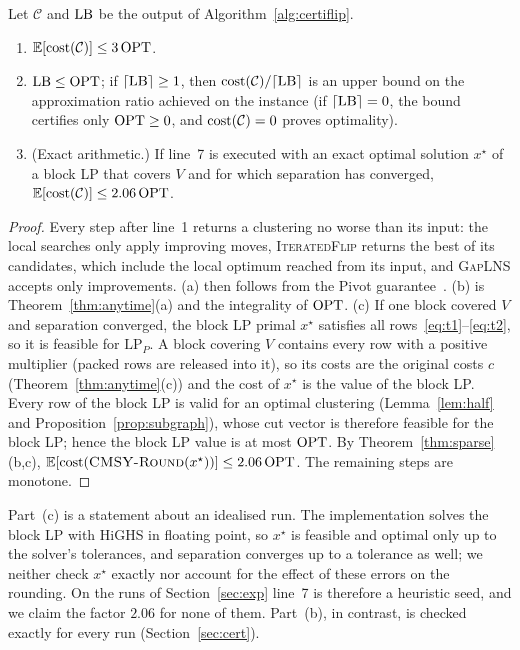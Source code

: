 \begin{theorem}\label{thm:certiflip}
Let $\mathcal C$ and $\mathrm{LB}$ be the output of Algorithm~\ref{alg:certiflip}.
\begin{enumerate}
\item[(a)] $\mathbb E[\mathrm{cost}(\mathcal C)]\le3\,\mathrm{OPT}$.
\item[(b)] $\mathrm{LB}\le\mathrm{OPT}$; if $\lceil\mathrm{LB}\rceil\ge1$, then
$\mathrm{cost}(\mathcal C)/\lceil\mathrm{LB}\rceil$ is an upper bound on the approximation
ratio achieved on the instance (if $\lceil\mathrm{LB}\rceil=0$, the bound certifies
only $\mathrm{OPT}\ge0$, and $\mathrm{cost}(\mathcal C)=0$ proves optimality).
\item[(c)] (Exact arithmetic.)  If line~7 is executed with an exact optimal
solution $x^\star$ of a block LP that covers $V$ and for which separation
has converged, $\mathbb E[\mathrm{cost}(\mathcal C)]\le 2.06\,\mathrm{OPT}$.
\end{enumerate}
\end{theorem}
\begin{proof}
Every step after line~1 returns a clustering no worse than its input: the
local searches only apply improving moves, \textsc{IteratedFlip} returns the
best of its candidates, which include the local optimum reached from its input,
and \textsc{GapLNS} accepts only improvements.  (a) then follows from the
Pivot guarantee~\citep{AilonCN08}.  (b) is Theorem~\ref{thm:anytime}(a) and
the integrality of $\mathrm{OPT}$.  (c) If one block covered $V$ and separation
converged, the block LP primal $x^\star$ satisfies all
rows~\eqref{eq:t1}--\eqref{eq:t2}, so it is feasible for $\mathrm{LP}_P$.
A block covering $V$ contains every row with a positive multiplier (packed
rows are released into it), so its costs are the original costs $c$
(Theorem~\ref{thm:anytime}(c)) and the cost of $x^\star$ is the value of the
block LP.  Every row of the block LP is valid for an
optimal clustering (Lemma~\ref{lem:half} and Proposition~\ref{prop:subgraph}),
whose cut vector is therefore feasible for the block LP; hence the block LP
value is at most $\mathrm{OPT}$.  By Theorem~\ref{thm:sparse}(b,c),
$\mathbb E[\mathrm{cost}(\textsc{CMSY-Round}(x^\star))]\le 2.06\,\mathrm{OPT}$.  The remaining
steps are monotone.
\end{proof}

Part~(c) is a statement about an idealised run.  The implementation solves
the block LP with HiGHS in floating point, so $x^\star$ is feasible and
optimal only up to the solver's tolerances, and separation converges up to a
tolerance as well; we neither check $x^\star$ exactly nor account for the
effect of these errors on the rounding.  On the runs of Section~\ref{sec:exp}
line~7 is therefore a heuristic seed, and we claim the factor $2.06$ for none
of them.  Part~(b), in contrast, is checked exactly for every run
(Section~\ref{sec:cert}).

